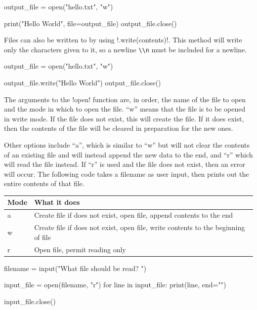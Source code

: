 \documentclass[11pt]{cselabheader}
\begin{document}
\begin{python3code}
output_file = open("hello.txt", "w")

print("Hello World", file=output_file)
output_file.close()
\end{python3code}

Files can also be written to by using \pythoninline!.write(contents)!. This
method will write only the characters given to it, so a newline \lstinline{\\n}
must be included for a newline.

\begin{python3code}
output_file = open("hello.txt", "w")

output_file.write("Hello World\n")
output_file.close()
\end{python3code}

The arguments to the \pythoninline!open! function are, in order, the name of the
file to open and the mode in which to open the file. ``w'' means that the file
is to be opened in write mode. If the file does not exist, this will create the
file. If it does exist, then the contents of the file will be cleared in
preparation for the new ones.

Other options include ``a'', which is similar to ``w'' but will not clear the
contents of an existing file and will instead append the new data to the end,
and ``r'' which will read the file instead. If ``r'' is used and the file does
not exist, then an error will occur. The following code takes a filename as user
input, then prints out the entire contents of that file.

\begin{table}[!ht]
  \centering
  \begin{tabular}{ll}
    Mode & What it does \\
    \midrule
    a & Create file if does not exist, open file, append contents to the end \\
    w & Create file if does not exist, open file, write contents to the beginning
    of file \\
    r & Open file, permit reading only \\
  \end{tabular}
\end{table}

\begin{python3code}
filename = input("What file should be read? ")

input_file = open(filename, "r")
for line in input_file:
    print(line, end="")

input_file.close()
\end{python3code}
\end{document}

